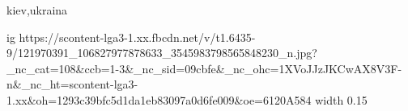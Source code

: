  
 
 
 
 

kiev,ukraina
\par
\ifcmt
  ig https://scontent-lga3-1.xx.fbcdn.net/v/t1.6435-9/121970391_106827977878633_3545983798565848230_n.jpg?_nc_cat=108&ccb=1-3&_nc_sid=09cbfe&_nc_ohc=1XVoJJzJKCwAX8V3F-n&_nc_ht=scontent-lga3-1.xx&oh=1293c39bfc5d1da1eb83097a0d6fe009&oe=6120A584
  width 0.15
\fi
